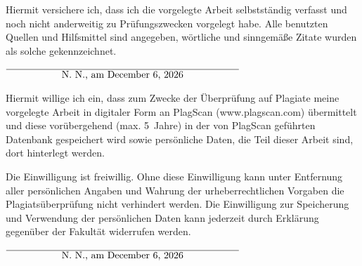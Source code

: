 \documentclass[12pt,twoside=false,a4paper,parskip]{scrbook}
\def\BaAuthor{Martin Rapps}
\def\ShowBaAuthor{\BaAuthor}
\def\ShowBaAuthor{N.~N.}
\begin{document}

Hiermit versichere ich, dass ich die vorgelegte Arbeit selbstständig verfasst und noch nicht anderweitig zu Prüfungszwecken vorgelegt habe. Alle benutzten Quellen und Hilfsmittel sind angegeben, wörtliche und sinngemäße Zitate wurden als solche gekennzeichnet.

\vspace{20pt}
\begin{flushright}
  $\overline{~~~~~~~~~~~~~~~~~\mbox{\ShowBaAuthor, am \today}~~~~~~~~~~~~~~~~~}$
\end{flushright}


Hiermit willige ich ein, dass zum Zwecke der Überprüfung auf Plagiate meine vorgelegte Arbeit in digitaler Form an PlagScan (www.plagscan.com) übermittelt und diese vorübergehend (max. 5~Jahre) in der von PlagScan geführten Datenbank gespeichert wird sowie persönliche Daten, die Teil dieser Arbeit sind, dort hinterlegt werden.

\begin{small}
  Die Einwilligung ist freiwillig. Ohne diese Einwilligung kann unter Entfernung aller persönlichen Angaben und Wahrung der urheberrechtlichen Vorgaben die Plagiatsüberprüfung nicht verhindert werden. Die Einwilligung zur Speicherung und Verwendung der persönlichen Daten kann jederzeit durch Erklärung gegenüber der Fakultät widerrufen werden.
\end{small}

\vspace{20pt}
\begin{flushright}
  $\overline{~~~~~~~~~~~~~~~~~\mbox{\ShowBaAuthor, am \today}~~~~~~~~~~~~~~~~~}$
\end{flushright}
\end{document}
